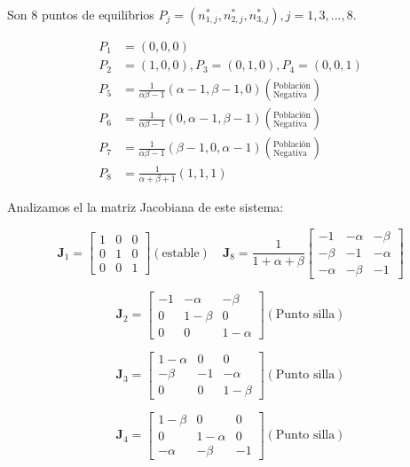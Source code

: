 \documentclass[twocolumn,aps,prl]{revtex4-1}
\newcommand{\nstar}{n^*}
\begin{document}
Son 8 puntos de equilibrios $P_j = (\nstar_{1,j},\nstar_{2,j},\nstar_{3,j}), j= 1, 3, ..., 8$.

$$
\begin{aligned}
    P_1 &= (0, 0, 0) \\ 
    P_2 &= (1, 0, 0), P_3 = (0, 1, 0), P_4 = (0, 0, 1) \\
    P_5 &= \frac{1}{\alpha \beta - 1} 
                       (\alpha - 1, \beta - 1 , 0)  \left(^\text{Población}_\text{Negativa} \right)  \\ 
    P_6 &= \frac{1}{\alpha \beta - 1} 
                       (0         , \alpha - 1, \beta - 1)  \left(^\text{Población}_\text{Negativa} \right)  \\ 
    P_7 &= \frac{1}{\alpha \beta - 1} 
                       (\beta - 1 , 0         , \alpha - 1)  \left(^\text{Población}_\text{Negativa} \right)  \\ 
    P_8 &= \frac{1}{\alpha + \beta + 1}(1, 1, 1) 
\end{aligned}
$$

Analizamos el la matriz Jacobiana de este sistema:

$$
\mathbf{J}_1 = 
\begin{bmatrix}
    1  & 0 & 0 \\
    0 & 1 & 0 \\
    0 & 0 & 1
\end{bmatrix} (\text{estable})
\quad 
\mathbf{J}_8 = 
\frac{1}{1+\alpha+\beta}\begin{bmatrix}
    -1 & -\alpha & -\beta \\
    -\beta & -1 & -\alpha \\
    -\alpha & -\beta & -1
\end{bmatrix}
$$

$$
\mathbf{J}_2 = 
\begin{bmatrix}
    -1 & - \alpha & - \beta \\
    0 & 1-\beta & 0 \\
    0 & 0 & 1- \alpha
\end{bmatrix} (\text{Punto silla})
$$

$$
\mathbf{J}_3 = 
\begin{bmatrix}
    1 - \alpha  & 0 & 0 \\
    - \beta & -1 & - \alpha \\
    0 & 0 & 1  - \beta
\end{bmatrix} (\text{Punto silla})
$$

$$
\mathbf{J}_4 = 
\begin{bmatrix}
    1 - \beta  & 0 & 0 \\
    0 & 1 -\alpha  & 0 \\
    - \alpha  & -\beta & -1
\end{bmatrix} (\text{Punto silla})
$$
\end{document}
